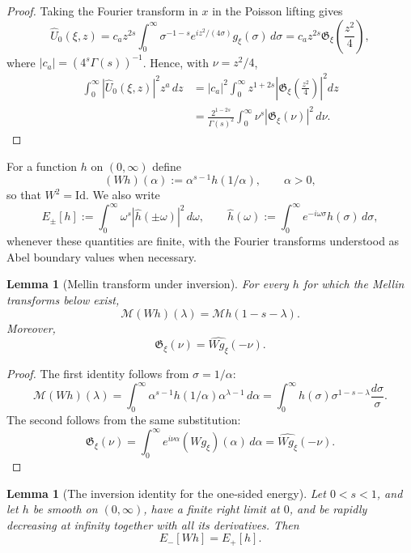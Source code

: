 \documentclass[11pt,letter]{amsart}
\def \G{\Gamma}
\numberwithin{equation}{section}
\newtheorem{lemma}[theorem]{Lemma}
\numberwithin{equation}{section}
\begin{document}
\begin{proof}
Taking the Fourier transform in $x$ in the Poisson lifting gives
\[
\widehat U_0(\xi,z)
=c_a z^{2s}\int_0^\infty \sigma^{-1-s}
 e^{iz^2/(4\sigma)}g_\xi(\sigma)\,d\sigma
=c_a z^{2s}\mathfrak G_\xi\!\left(\frac{z^2}{4}\right),
\]
where $|c_a|=(4^s\G(s))^{-1}$. Hence, with $\nu=z^2/4$,
\[
\begin{aligned}
\int_0^\infty|\widehat U_0(\xi,z)|^2z^a\,dz
&=|c_a|^2\int_0^\infty z^{1+2s}
\left|\mathfrak G_\xi\!\left(\frac{z^2}{4}\right)\right|^2dz\\
&=\frac{2^{1-2s}}{\G(s)^2}
\int_0^\infty\nu^s|\mathfrak G_\xi(\nu)|^2\,d\nu.
\end{aligned}
\]
\end{proof}

For a function $h$ on $(0,\infty)$ define
\[
(Wh)(\alpha):=\alpha^{s-1}h(1/\alpha),\qquad \alpha>0,
\]
so that $W^2=\mathrm{Id}$. We also write
\[
E_\pm[h]:=\int_0^\infty\omega^s|\widehat h(\pm\omega)|^2\,d\omega,
\qquad
\widehat h(\omega):=\int_0^\infty e^{-i\omega\sigma}h(\sigma)\,d\sigma,
\]
whenever these quantities are finite, with the Fourier transforms understood as
Abel boundary values when necessary.

\begin{lemma}[Mellin transform under inversion]\label{L:MellinW}
For every $h$ for which the Mellin transforms below exist,
\[
\mathscr M(Wh)(\lambda)=\mathscr Mh(1-s-\lambda).
\]
Moreover,
\[
\mathfrak G_\xi(\nu)=\widehat{Wg_\xi}(-\nu).
\]
\end{lemma}

\begin{proof}
The first identity follows from $\sigma=1/\alpha$:
\[
\mathscr M(Wh)(\lambda)
=\int_0^\infty \alpha^{s-1}h(1/\alpha)\alpha^{\lambda-1}\,d\alpha
=\int_0^\infty h(\sigma)\sigma^{1-s-\lambda}\frac{d\sigma}{\sigma}.
\]
The second follows from the same substitution:
\[
\mathfrak G_\xi(\nu)
=\int_0^\infty e^{i\nu\alpha}(Wg_\xi)(\alpha)\,d\alpha
=\widehat{Wg_\xi}(-\nu).
\]
\end{proof}

\begin{lemma}[The inversion identity for the one-sided energy]\label{L:MellinSwap}
Let $0<s<1$, and let $h$ be smooth on $(0,\infty)$, have a finite right limit at $0$, and be rapidly decreasing at infinity together with all its derivatives. Then
\begin{equation}\label{E:MellinSwap}
E_-[Wh]=E_+[h].
\end{equation}
\end{lemma}
\end{document}
